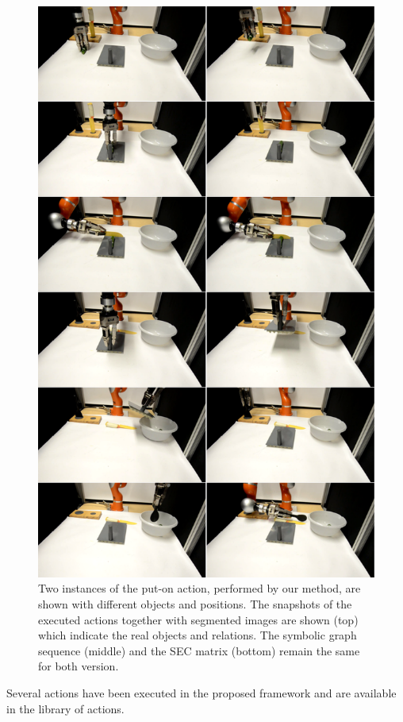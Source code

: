 \begin{figure}
      \centering
      \includegraphics[scale=0.5]{./pdf/scenario_result.pdf}
      \caption{ Two instances of the put-on action, performed by our method, are shown with different objects and positions. 
The snapshots of the executed actions together with segmented images are shown (top) which indicate the real objects and relations.
The symbolic graph sequence (middle) and the SEC matrix (bottom) remain the same for both version.
}
      \label{fig:scenario_result}
\end{figure}
Several actions have been executed in the proposed framework and are available in the library of actions.
